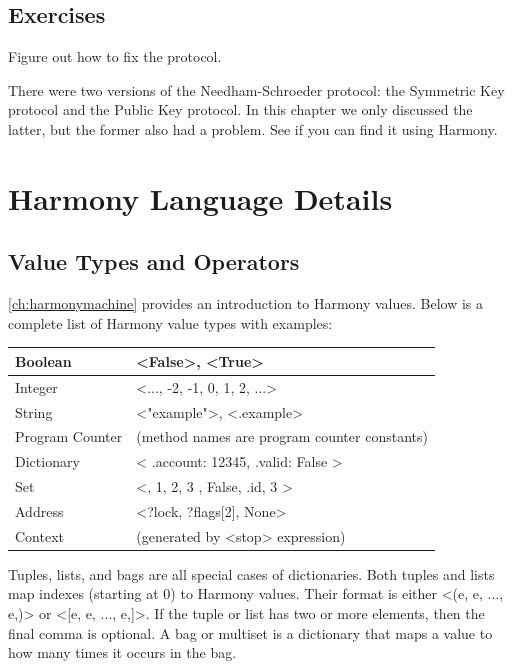 \documentclass{report}
\begin{document}
\section*{Exercises}
\begin{problems}
\item Figure out how to fix the protocol.
\item There were two versions of the Needham-Schroeder protocol: the
Symmetric Key protocol and the Public Key protocol.  In this chapter
we only discussed the latter, but the former also had a problem.  See
if you can find it using Harmony.
\end{problems}




\appendix

\chapter{Harmony Language Details}

\section{Value Types and Operators}
\label{ap:values}

\autoref{ch:harmonymachine} provides an introduction to Harmony values.
Below is a complete list of Harmony value types with examples:

\vspace{1em}
\begin{tabular}{|l|l|}
\hline
Boolean & <{False}>, <{True}> \\
\hline
Integer & <{..., -2, -1, 0, 1, 2, ...}> \\
\hline
String & <{"example"}>, <{.example}> \\
\hline
Program Counter & (method names are program counter constants) \\
\hline
Dictionary & <{{ .account: 12345, .valid: False }}> \\
\hline
Set & <{{}, { 1, 2, 3 }, { False, .id, 3 }}> \\
\hline
Address & <{?lock, ?flags[2], None}> \\
\hline
Context & (generated by <{stop}> expression) \\
\hline
\end{tabular}
\vspace{1em}

Tuples, lists, and bags are all special cases of dictionaries.
Both tuples and lists map indexes (starting at 0) to Harmony values.
Their format is either <{(e, e, ..., e,)}> or <{[e, e, ..., e,]}>.
If the tuple or list has two or more elements, then the final comma
is optional.
A bag or multiset is a dictionary that maps a value to how many
times it occurs in the bag.
\end{document}
